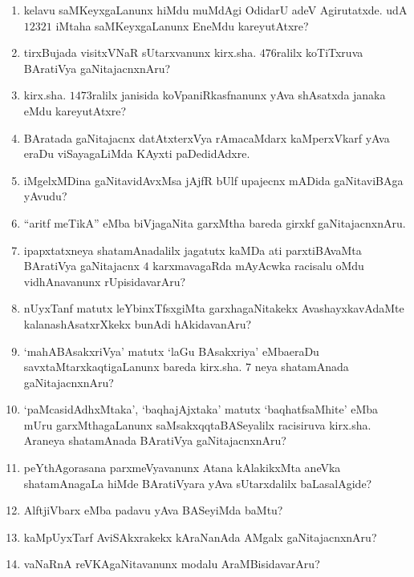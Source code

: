 \begin{enumerate}
\item kelavu saMKeyxgaLanunx hiMdu muMdAgi OdidarU adeV Agirutatxde. udA $12321$ iMtaha saMKeyxgaLanunx EneMdu kareyutAtxre?
  
\item tirxBujada visitxVNaR sUtarxvanunx  kirx.sha. $476$ralilx koTiTxruva BAratiVya gaNitajacnxnAru?
  
\item kirx.sha. $1473$ralilx janisida koVpaniRkasfnanunx yAva shAsatxda janaka eMdu kareyutAtxre?
  
\item BAratada gaNitajacnx datAtxterxVya rAmacaMdarx kaMperxVkarf yAva eraDu viSayagaLiMda KAyxti paDedidAdxre. 
  
\item iMgelxMDina gaNitavidAvxMsa jAjfR bUlf upajecnx mADida gaNitaviBAga yAvudu?
  
\item``aritf meTikA'' eMba biVjagaNita garxMtha bareda girxkf gaNitajacnxnAru.

\item ipapxtatxneya shatamAnadalilx jagatutx kaMDa ati parxtiBAvaMta BAratiVya gaNitajacnx $4$ karxmavagaRda mAyAcwka racisalu oMdu vidhAnavanunx rUpisidavarAru?
  
\item nUyxTanf matutx leYbinxTfsxgiMta garxhagaNitakekx AvashayxkavAdaMte kalanashAsatxrXkekx bunAdi hAkidavanAru?
  
\item `mahABAsakxriVya' matutx `laGu BAsakxriya' eMbaeraDu savxtaMtarxkaqtigaLanunx bareda kirx.sha. $7$ neya shatamAnada gaNitajacnxnAru?
  
\item `paMcasidAdhxMtaka', `baqhajAjxtaka' matutx `baqhatfsaMhite' eMba mUru garxMthagaLanunx saMsakxqqtaBASeyalilx racisiruva kirx.sha. Araneya shatamAnada BAratiVya gaNitajacnxnAru?
  
\item peYthAgorasana parxmeVyavanunx Atana kAlakikxMta aneVka shatamAnagaLa hiMde BAratiVyara yAva sUtarxdalilx baLasalAgide?
  
\item AlftjiVbarx eMba padavu yAva BASeyiMda baMtu?
  
\item kaMpUyxTarf AviSAkxrakekx kAraNanAda AMgalx gaNitajacnxnAru?
  
 \item vaNaRnA reVKAgaNitavanunx modalu AraMBisidavarAru?


\end{enumerate}

